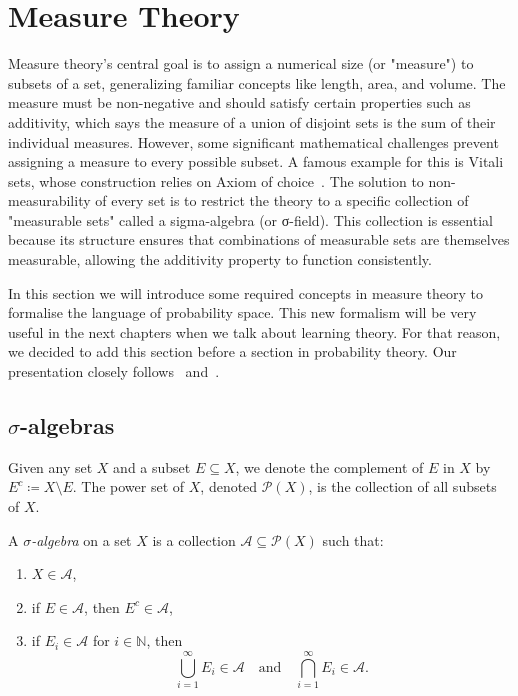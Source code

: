 \section{Measure Theory}\label{sec:measure-theory}



Measure theory's central goal is to assign a numerical size (or "measure") to subsets of a set, generalizing familiar concepts like length, area, and volume. The measure must be non-negative and should satisfy certain properties such as additivity, which says the measure of a union of disjoint sets is the sum of their individual measures. However, some significant mathematical challenges prevent assigning a measure to every possible subset. A famous example for this is Vitali sets, whose construction relies on Axiom of choice~\cite{HerrlichAxiomOfChoice}. The solution to non-measurability of every set is to restrict the theory to a specific collection of "measurable sets" called a sigma-algebra (or σ-field). This collection is essential because its structure ensures that combinations of measurable sets are themselves measurable, allowing the additivity property to function consistently.


In this section we will introduce some required concepts in measure theory to formalise the language of probability space. This new formalism will be very useful in the next chapters when we talk about learning theory. For that reason, we decided to add this section before a section in probability theory. Our presentation closely follows~\cite{MeasureTheoryCohn} and~\cite{MeasureTheoryLeGall}.

\subsection{$\sigma$-algebras}

Given any set $X$ and a subset $E \subseteq X$, we denote the complement of $E$ in $X$ by $E^c \coloneq X \setminus E$. The power set of $X$, denoted $\mathcal{P}(X)$, is the collection of all subsets of $X$.

\begin{definition}
    \label{def:sigma-algebra}
    A \emph{$\sigma$-algebra} on a set $X$ is a collection $\mathcal{A} \subseteq \mathcal{P}(X)$ such that:
    \begin{enumerate}[label=(\roman*)]
        \item $X \in \mathcal{A}$,
        \item if $E \in \mathcal{A}$, then $E^c \in \mathcal{A}$,
        \item if $E_i \in \mathcal{A}$ for $i \in \mathbb{N}$, then
        \[
            \bigcup_{i=1}^\infty E_i \in \mathcal{A} \quad \text{and} \quad \bigcap_{i=1}^\infty E_i \in \mathcal{A}.
        \]
    \end{enumerate}
\end{definition}

